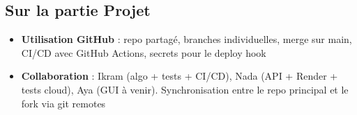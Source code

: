 \documentclass[12pt,a4paper]{article}
\begin{document}
\subsection{Sur la partie Projet}
\begin{itemize}
    \item \textbf{Utilisation GitHub} : repo partagé, branches individuelles, merge sur main, CI/CD avec GitHub Actions, secrets pour le deploy hook
    \item \textbf{Collaboration} : Ikram (algo + tests + CI/CD), Nada (API + Render + tests cloud), Aya (GUI à venir). Synchronisation entre le repo principal et le fork via git remotes
\end{itemize}
\end{document}
